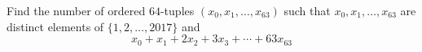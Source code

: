 Find the number of ordered $64$-tuples $(x_0,x_1,\dots,x_{63})$ such that $x_0,x_1,\dots,x_{63}$ are distinct elements of $\{1,2,\dots,2017\}$ and 
\[
x_0 + x_1 + 2x_2 + 3x_3 + \cdots + 63 x_{63}
\]
